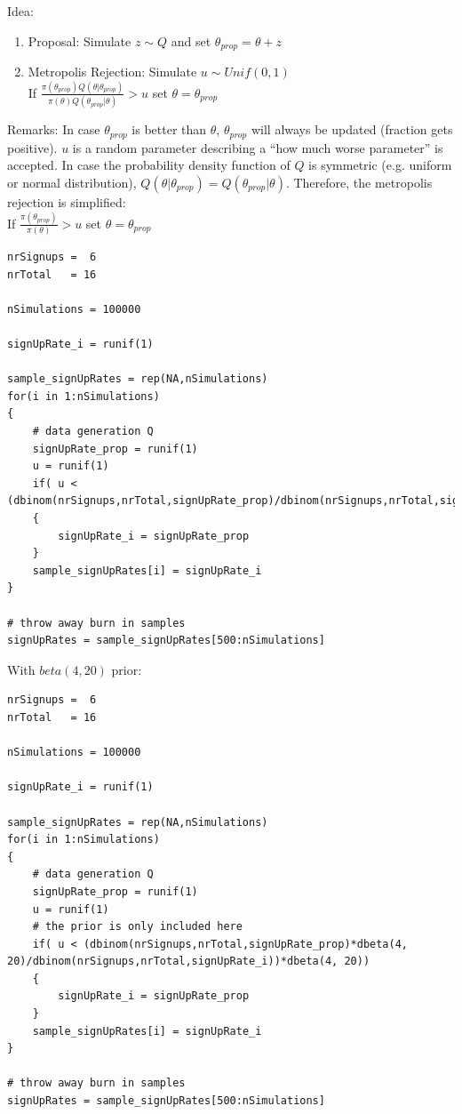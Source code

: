 Idea:
\begin{enumerate}
	\tightlist
	\item Proposal: Simulate $z\sim Q$ and set $\theta_{prop} = \theta + z$
	\item Metropolis Rejection: Simulate $u\sim Unif(0, 1)$\\
	If $\frac{\pi(\theta_{prop})Q(\theta|\theta_{prop})}{\pi(\theta)Q(\theta_{prop}|\theta)}>u$ set $\theta = \theta_{prop}$
\end{enumerate}
Remarks: In case $\theta_{prop}$ is better than $\theta$,  $\theta_{prop}$ will always be updated (fraction gets positive). $u$ is a random parameter describing a ``how much worse parameter'' is accepted. In case the probability density function of $Q$ is symmetric (e.g. uniform or normal distribution), $Q(\theta|\theta_{prop}) = Q(\theta_{prop}|\theta)$. Therefore, the metropolis rejection is simplified:\\
If $\frac{\pi(\theta_{prop})}{\pi(\theta)}>u$ set $\theta = \theta_{prop}$
\begin{lstlisting}
nrSignups =  6
nrTotal   = 16

nSimulations = 100000

signUpRate_i = runif(1)

sample_signUpRates = rep(NA,nSimulations)
for(i in 1:nSimulations)
{
	# data generation Q
	signUpRate_prop = runif(1)
	u = runif(1)
	if( u < (dbinom(nrSignups,nrTotal,signUpRate_prop)/dbinom(nrSignups,nrTotal,signUpRate_i)))
	{
		signUpRate_i = signUpRate_prop
	}
	sample_signUpRates[i] = signUpRate_i
}

# throw away burn in samples
signUpRates = sample_signUpRates[500:nSimulations]
\end{lstlisting}

With $beta(4, 20)$ prior:
\begin{lstlisting}
nrSignups =  6
nrTotal   = 16

nSimulations = 100000

signUpRate_i = runif(1)

sample_signUpRates = rep(NA,nSimulations)
for(i in 1:nSimulations)
{
	# data generation Q
	signUpRate_prop = runif(1)
	u = runif(1)
	# the prior is only included here
	if( u < (dbinom(nrSignups,nrTotal,signUpRate_prop)*dbeta(4, 20)/dbinom(nrSignups,nrTotal,signUpRate_i))*dbeta(4, 20))
	{
		signUpRate_i = signUpRate_prop
	}
	sample_signUpRates[i] = signUpRate_i
}

# throw away burn in samples
signUpRates = sample_signUpRates[500:nSimulations]
\end{lstlisting}


